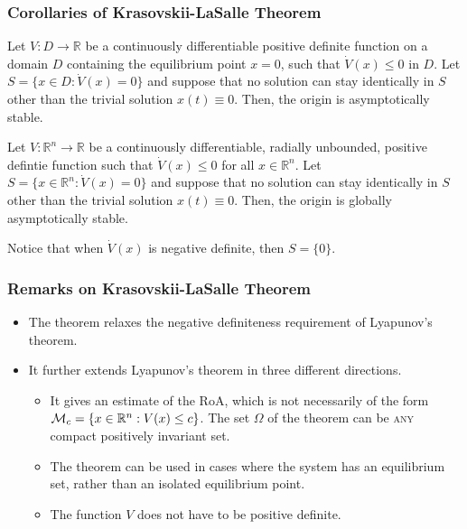 \begin{frame}
    \frametitle{Corollaries of Krasovskii-LaSalle Theorem}

    \begin{corollary}
        Let $V: D \rightarrow \mathbb{R}$ be a continuously differentiable
        positive definite function on a domain $D$ containing the equilibrium
        point $x=0$, such that $\dot{V}(x) \leq 0$ in $D$. Let $S = \{x \in D:
        \dot{V}(x) = 0\}$ and suppose that no solution can stay identically in
        $S$ other than the trivial solution $x(t) \equiv 0$. Then, the origin is
        asymptotically stable.
    \end{corollary}

    \begin{corollary}
        Let $V: \mathbb{R}^n \rightarrow \mathbb{R}$ be a continuously
        differentiable, radially unbounded, positive defintie function such that
        $\dot{V}(x) \leq 0$ for all $x \in \mathbb{R}^n$. Let $S = \{x \in
        \mathbb{R}^n: \dot{V}(x) = 0\}$ and suppose that no solution can stay
        identically in $S$ other than the trivial solution $x(t) \equiv 0$.
        Then, the origin is globally asymptotically stable.
    \end{corollary}

    Notice that when $\dot{V}(x)$ is negative definite, then $S = \{0\}$.
\end{frame}


\begin{frame}
    \frametitle{Remarks on Krasovskii-LaSalle Theorem}

    \begin{itemize}
        \item The theorem relaxes the negative definiteness requirement of
        Lyapunov's theorem.
        \item It further extends Lyapunov's theorem in three different
        directions.
        \begin{itemize}
            \item It gives an estimate of the RoA, which is not necessarily of
            the form $\mathcal{M}_c = \{ x \in \mathbb{R}^n: V(x) \leq c\}$. The set
            $\Omega$ of the theorem can be \textsc{any} compact positively
            invariant set.
            \item The theorem can be used in cases where the system has an
            equilibrium set, rather than an isolated equilibrium point.
            \item The function $V$ does not have to be positive definite.
        \end{itemize}
    \end{itemize}
\end{frame}


\endgroup